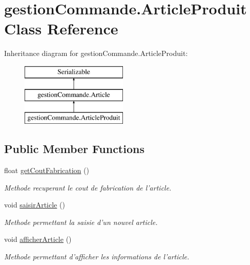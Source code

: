 \hypertarget{classgestion_commande_1_1_article_produit}{\section{gestion\-Commande.\-Article\-Produit Class Reference}
\label{classgestion_commande_1_1_article_produit}
}
Inheritance diagram for gestion\-Commande.\-Article\-Produit\-:\begin{figure}[H]
\begin{center}
\leavevmode
\includegraphics[height=3.000000cm]{classgestion_commande_1_1_article_produit}
\end{center}
\end{figure}
\subsection*{Public Member Functions}
\begin{DoxyCompactItemize}
\item 
float \hyperlink{classgestion_commande_1_1_article_produit_a9841bb3b200eebed8f41d693be10cffe}{get\-Cout\-Fabrication} ()
\begin{DoxyCompactList}\small\item\em Methode recuperant le cout de fabrication de l'article. \end{DoxyCompactList}\item 
void \hyperlink{classgestion_commande_1_1_article_produit_a4f8d0da086aa398f89f67384b3933de7}{saisir\-Article} ()
\begin{DoxyCompactList}\small\item\em Methode permettant la saisie d'un nouvel article. \end{DoxyCompactList}\item 
void \hyperlink{classgestion_commande_1_1_article_produit_aa6c49e11ed8fddd9088d98afb481e9d8}{afficher\-Article} ()
\begin{DoxyCompactList}\small\item\em Methode permettant d'afficher les informations de l'article. \end{DoxyCompactList}\end{DoxyCompactItemize}


